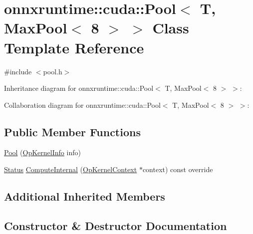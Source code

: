 \hypertarget{classonnxruntime_1_1cuda_1_1Pool_3_01T_00_01MaxPool_3_018_01_4_01_4}{}\section{onnxruntime\+:\+:cuda\+:\+:Pool$<$ T, Max\+Pool$<$ 8 $>$ $>$ Class Template Reference}
\label{classonnxruntime_1_1cuda_1_1Pool_3_01T_00_01MaxPool_3_018_01_4_01_4}


{\ttfamily \#include $<$pool.\+h$>$}



Inheritance diagram for onnxruntime\+:\+:cuda\+:\+:Pool$<$ T, Max\+Pool$<$ 8 $>$ $>$\+:


Collaboration diagram for onnxruntime\+:\+:cuda\+:\+:Pool$<$ T, Max\+Pool$<$ 8 $>$ $>$\+:
\subsection*{Public Member Functions}
\begin{DoxyCompactItemize}
\item 
\mbox{\hyperlink{classonnxruntime_1_1cuda_1_1Pool_3_01T_00_01MaxPool_3_018_01_4_01_4_a0931e1df95d20de388971d9de6061de8}{Pool}} (\mbox{\hyperlink{classonnxruntime_1_1OpKernelInfo}{Op\+Kernel\+Info}} info)
\item 
\mbox{\hyperlink{classonnxruntime_1_1common_1_1Status}{Status}} \mbox{\hyperlink{classonnxruntime_1_1cuda_1_1Pool_3_01T_00_01MaxPool_3_018_01_4_01_4_a1f0b209299a68e00ff1187ad7eea3b72}{Compute\+Internal}} (\mbox{\hyperlink{classonnxruntime_1_1OpKernelContext}{Op\+Kernel\+Context}} $\ast$context) const override
\end{DoxyCompactItemize}
\subsection*{Additional Inherited Members}


\subsection{Constructor \& Destructor Documentation}
\mbox{\label{classonnxruntime_1_1cuda_1_1Pool_3_01T_00_01MaxPool_3_018_01_4_01_4_a0931e1df95d20de388971d9de6061de8}} 
